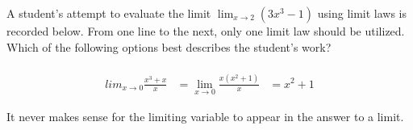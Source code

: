 \documentclass{ximera}
\author{Steven Gubkin}
\begin{document}
\begin{exercise}

	A student's attempt to evaluate the limit $\lim_{x \to 2} \left( 3x^3-1 \right)$ using limit laws is recorded below.  From one line to the next, only one limit law should be utilized.  Which of the following options best describes the student's work?
	
	\begin{align*}
		\\lim_{x \to 0} \frac{x^3 + x}{x} &= \lim_{x \to 0} \frac{x(x^2+1)}{x}
		&= x^2+1
	\end{align*}
	
	\begin{multipleChoice}
	\end{multipleChoice}
	
	\begin{feedback}
		It never makes sense for the limiting variable to appear in the answer to a limit.
	\end{feedback}
	
\end{exercise}
\end{document}
